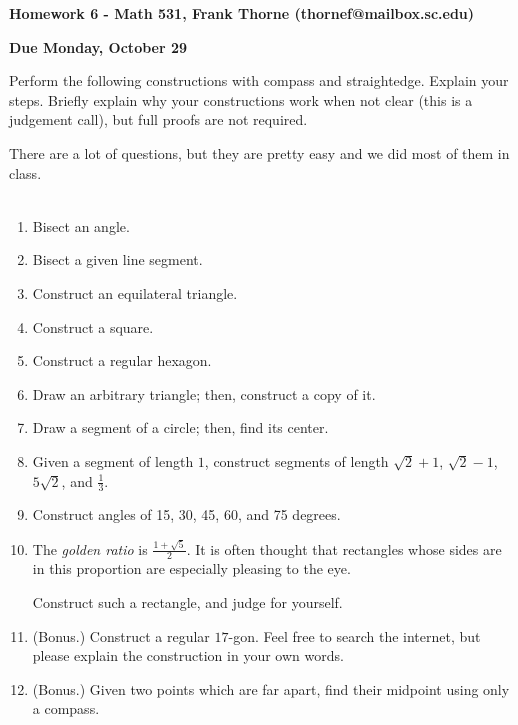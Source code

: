 \documentclass[12pt]{article}
\begin{document}
\setlength{\topmargin}{-2mm}





\begin{center}{\bf Homework 6 - Math 531, Frank Thorne (thornef@mailbox.sc.edu)}
\end{center}
\begin{center}
{\bf Due Monday, October 29}
\end{center}
Perform the following constructions with compass and straightedge. Explain your steps.
Briefly explain why your constructions work when not clear (this is a judgement call),
but full proofs are not required.

There are a lot of questions, but they are pretty easy and we did most of them in class.
\\
\\
\begin{enumerate}[(1)]
\item
Bisect an angle.
\item
Bisect a given line segment.
\item
Construct an equilateral triangle.
\item
Construct a square.
\item
Construct a regular hexagon.
\item
Draw an arbitrary triangle; then, construct a copy of it.
\item
Draw a segment of a circle; then, find its center.
\item
Given a segment of length $1$, construct segments of length $\sqrt{2} + 1$, $\sqrt{2} - 1$, $5 \sqrt{2}$, 
and $\frac{1}{3}$.
\item
Construct angles of 15, 30, 45, 60, and 75 degrees.
\item
The {\itshape golden ratio} is $\frac{1 + \sqrt{5}}{2}$. It is often thought that rectangles whose sides
are in this proportion are especially pleasing to the eye.

Construct such a rectangle, and judge for yourself.
\item (Bonus.)
Construct a regular $17$-gon. Feel free to search the internet, but please explain the construction in
your own words.

\item (Bonus.)
Given two points which are far apart, find their midpoint using only a compass.

\end{enumerate}
\end{document}
